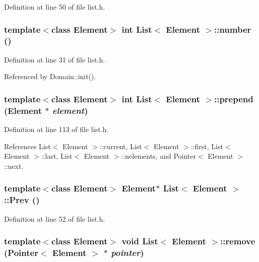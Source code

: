 Definition at line 50 of file list.h.\hypertarget{classList_b9c6ee975d247a73b16a72c509596c0e}{
\subsubsection[{number}]{\setlength{\rightskip}{0pt plus 5cm}template$<$class Element$>$ int {\bf List}$<$ Element $>$::number ()}}
\label{classList_b9c6ee975d247a73b16a72c509596c0e}




Definition at line 31 of file list.h.

Referenced by Domain::init().\hypertarget{classList_24f0afaa932fd67d06dfb547056e7e8e}{
\subsubsection[{prepend}]{\setlength{\rightskip}{0pt plus 5cm}template$<$class Element$>$ int {\bf List}$<$ Element $>$::prepend (Element $\ast$ {\em element})}}
\label{classList_24f0afaa932fd67d06dfb547056e7e8e}




Definition at line 113 of file list.h.

References List$<$ Element $>$::current, List$<$ Element $>$::first, List$<$ Element $>$::last, List$<$ Element $>$::nelements, and Pointer$<$ Element $>$::next.\hypertarget{classList_4891b8f96a259673aa3f7ae84a940116}{
\subsubsection[{Prev}]{\setlength{\rightskip}{0pt plus 5cm}template$<$class Element$>$ Element$\ast$ {\bf List}$<$ Element $>$::Prev ()}}
\label{classList_4891b8f96a259673aa3f7ae84a940116}




Definition at line 52 of file list.h.\hypertarget{classList_0cedb2527218b02e95b0106db775a10f}{
\subsubsection[{remove}]{\setlength{\rightskip}{0pt plus 5cm}template$<$class Element$>$ void {\bf List}$<$ Element $>$::remove ({\bf Pointer}$<$ Element $>$ $\ast$ {\em pointer})}}
\label{classList_0cedb2527218b02e95b0106db775a10f}




